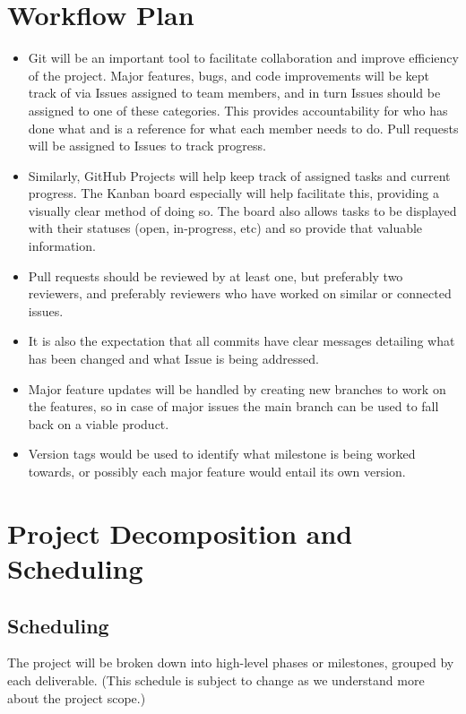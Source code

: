 \documentclass{article}
\begin{document}
\section{Workflow Plan}

\begin{itemize}
	\item Git will be an important tool to facilitate collaboration and improve efficiency of the project. Major features, bugs, and code improvements will be kept track of via Issues assigned to team members, and in turn Issues should be assigned to one of these categories. This provides accountability for who has done what and is a reference for what each member needs to do. Pull requests will be assigned to Issues to track progress.
	\item Similarly, GitHub Projects will help keep track of assigned tasks and current progress. The Kanban board especially will help facilitate this, providing a visually clear method of doing so. The board also allows tasks to be displayed with their statuses (open, in-progress, etc) and so provide that valuable information.
    \item Pull requests should be reviewed by at least one, but preferably two reviewers, and preferably reviewers who have worked on similar or connected issues. 
    \item It is also the expectation that all commits have clear messages detailing what has been changed and what Issue is being addressed.
    \item Major feature updates will be handled by creating new branches to work on the features, so in case of major issues the main branch can be used to fall back on a viable product.
    \item Version tags would be used to identify what milestone is being worked towards, or possibly each major feature would entail its own version. 
\end{itemize}

\section{Project Decomposition and Scheduling}

\subsection*{Scheduling}
The project will be broken down into high-level phases or milestones, grouped by each deliverable. (This schedule is subject to change as we understand more about the project scope.)
\end{document}
